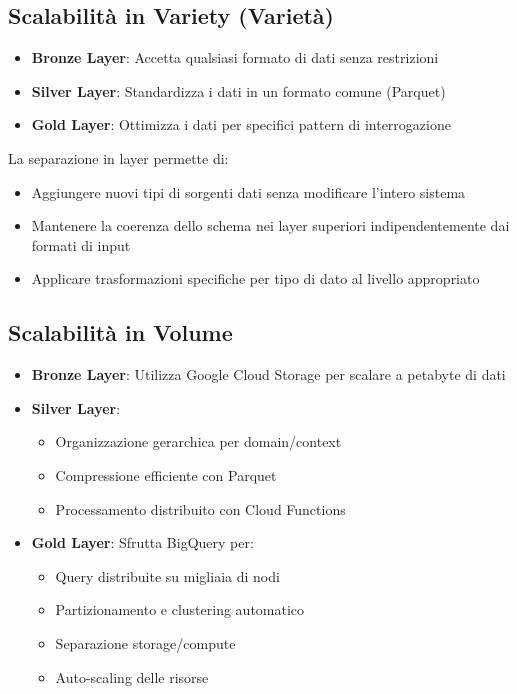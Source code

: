 \documentclass[11pt,a4paper,twoside]{report}
\begin{document}
\subsection{Scalabilità in Variety (Varietà)}
\begin{itemize}
    \item \textbf{Bronze Layer}: Accetta qualsiasi formato di dati senza restrizioni
    \item \textbf{Silver Layer}: Standardizza i dati in un formato comune (Parquet)
    \item \textbf{Gold Layer}: Ottimizza i dati per specifici pattern di interrogazione
\end{itemize}

La separazione in layer permette di:
\begin{itemize}
    \item Aggiungere nuovi tipi di sorgenti dati senza modificare l'intero sistema
    \item Mantenere la coerenza dello schema nei layer superiori indipendentemente dai formati di input
    \item Applicare trasformazioni specifiche per tipo di dato al livello appropriato
\end{itemize}

\subsection{Scalabilità in Volume}
\begin{itemize}
    \item \textbf{Bronze Layer}: Utilizza Google Cloud Storage per scalare a petabyte di dati
    \item \textbf{Silver Layer}: 
        \begin{itemize}
            \item Organizzazione gerarchica per domain/context
            \item Compressione efficiente con Parquet
            \item Processamento distribuito con Cloud Functions
        \end{itemize}
    \item \textbf{Gold Layer}: Sfrutta BigQuery per:
        \begin{itemize}
            \item Query distribuite su migliaia di nodi
            \item Partizionamento e clustering automatico
            \item Separazione storage/compute
            \item Auto-scaling delle risorse
        \end{itemize}
\end{itemize}
\end{document}
